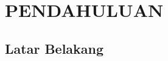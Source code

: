 
\chapter{PENDAHULUAN}  %

\ifpdf
    \graphicspath{{Chapter1/Figs/Raster/}{Chapter1/Figs/PDF/}{Chapter1/Figs/}}
\else
    \graphicspath{{Chapter1/Figs/Vector/}{Chapter1/Figs/}}
\fi


\section{Latar Belakang} %







